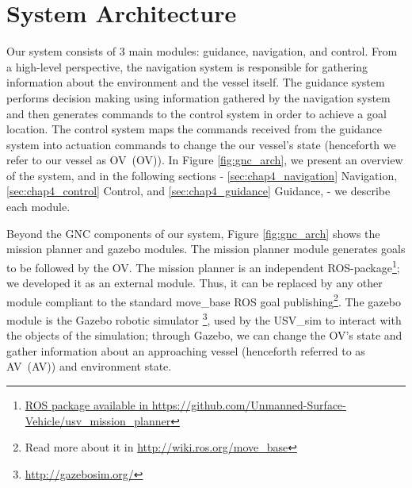 \section{System Architecture}
\label{sec:sys_arch}

    Our system consists of 3 main modules: guidance, navigation, and control. From a high-level perspective, the navigation system is responsible for gathering information about the environment and the vessel itself. The guidance system performs decision making using information gathered by the navigation system and then generates commands to the control system in order to achieve a goal location. The control system maps the commands received from the guidance system into actuation commands to change the our vessel's state (henceforth we refer to our vessel as \acl{OV}~(\ac{OV})). In Figure \ref{fig:gnc_arch}, we present an overview of the system, and in the following sections - \ref{sec:chap4_navigation} Navigation, \ref{sec:chap4_control} Control, and \ref{sec:chap4_guidance} Guidance, - we describe each module.

    Beyond the \ac{GNC} components of our system, Figure \ref{fig:gnc_arch} shows the mission planner and gazebo modules. 
    The mission planner module generates goals to be followed by the \ac{OV}. The mission planner is an independent ROS-package\footnote{\url{ROS package available in https://github.com/Unmanned-Surface-Vehicle/usv\_mission\_planner}}; we developed it as an external module. Thus, it can be replaced by any other module compliant to the standard move\_base ROS     goal publishing\footnote{Read more about it in \url{http://wiki.ros.org/move\_base}}. The gazebo module is the Gazebo robotic simulator \footnote{\url{http://gazebosim.org/}}, used by the USV\_sim  to interact with the objects of the simulation; through Gazebo, we can change the \ac{OV}'s state and gather information about an approaching vessel (henceforth referred to as \acl{AV}~(\ac{AV})) and environment state.

